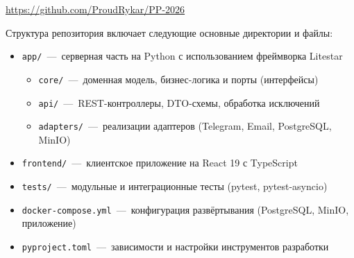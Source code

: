 \documentclass[12pt,a4paper]{report}
\begin{document}
\medskip
\begin{center}
\url{https://github.com/ProudRykar/PP-2026}
\end{center}
\medskip

Структура репозитория включает следующие основные директории и файлы:

\begin{itemize}
    \item \texttt{app/}~---~серверная часть на Python с использованием фреймворка Litestar
    \begin{itemize}
        \item \texttt{core/}~---~доменная модель, бизнес-логика и порты (интерфейсы)
        \item \texttt{api/}~---~REST-контроллеры, DTO-схемы, обработка исключений
        \item \texttt{adapters/}~---~реализации адаптеров (Telegram, Email, PostgreSQL, MinIO)
    \end{itemize}
    \item \texttt{frontend/}~---~клиентское приложение на React 19 с TypeScript
    \item \texttt{tests/}~---~модульные и интеграционные тесты (pytest, pytest-asyncio)
    \item \texttt{docker-compose.yml}~---~конфигурация развёртывания (PostgreSQL, MinIO, приложение)
    \item \texttt{pyproject.toml}~---~зависимости и настройки инструментов разработки
\end{itemize}
\end{document}
